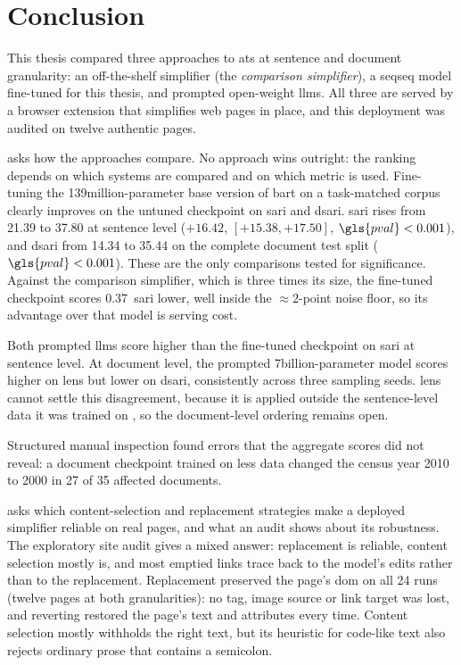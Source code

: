 \chapter{Conclusion}
\label{sec:conclusion}

\glsresetall
This thesis compared three approaches to \gls{ats} at sentence and document granularity: an off-the-shelf simplifier (the \emph{comparison simplifier}), a \gls{seqseq} model fine-tuned for this thesis, and prompted open-weight \glspl{llm}.
All three are served by a browser extension that simplifies web pages in place, and this deployment was audited on twelve authentic pages.

\textbf{} asks how the approaches compare.
No approach wins outright: the ranking depends on which systems are compared and on which metric is used.
Fine-tuning the 139\gls{million}-parameter base version of \gls{bart} on a task-matched corpus clearly improves on the untuned checkpoint on \gls{sari} and \gls{dsari}.
\Gls{sari} rises from \num{21.39} to \num{37.80} at sentence level (\(+16.42\),  \([+15.38, +17.50]\), \(\gls{pval} < 0.001\)), and \gls{dsari} from \num{14.34} to \num{35.44} on the complete document test split (\(\gls{pval} < 0.001\)).
These are the only comparisons tested for significance.
Against the comparison simplifier, which is three times its size, the fine-tuned checkpoint scores \num{0.37}~\gls{sari} lower, well inside the \({\approx}2\)-point noise floor, so its advantage over that model is serving cost.

Both prompted \glspl{llm} score higher than the fine-tuned checkpoint on \gls{sari} at sentence level.
At document level, the prompted 7\gls{billion}-parameter model scores higher on \gls{lens} but lower on \gls{dsari}, consistently across three sampling seeds.
\Gls{lens} cannot settle this disagreement, because it is applied outside the sentence-level data it was trained on \parencite[16385--16386]{maddela-etal-2023-lens}, so the document-level ordering remains open.

Structured manual inspection found errors that the aggregate scores did not reveal: a document checkpoint trained on less data changed the census year 2010 to 2000 in 27 of 35 affected documents.

\textbf{} asks which content-selection and replacement strategies make a deployed simplifier reliable on real pages, and what an audit shows about its robustness.
The exploratory site audit gives a mixed answer: replacement is reliable, content selection mostly is, and most emptied links trace back to the model's edits rather than to the replacement.
Replacement preserved the page's \gls{dom} on all 24 runs (twelve pages at both granularities): no tag, image source or link target was lost, and reverting restored the page's text and attributes every time.
Content selection mostly withholds the right text, but its heuristic for code-like text also rejects ordinary prose that contains a semicolon.


